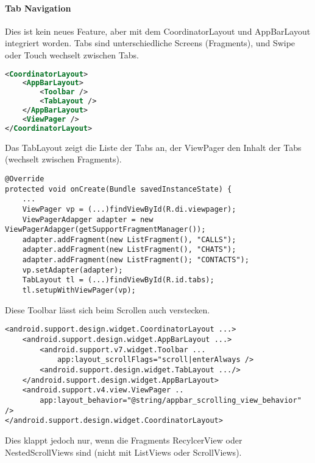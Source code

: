 \paragraph{Tab Navigation} Dies ist kein neues Feature, aber mit dem CoordinatorLayout und AppBarLayout integriert worden. Tabs sind unterschiedliche Screens (Fragments), und Swipe oder Touch wechselt zwischen Tabs.
\begin{lstlisting}[language=xml]
<CoordinatorLayout>
    <AppBarLayout>
        <Toolbar />
        <TabLayout />
    </AppBarLayout>
    <ViewPager />
</CoordinatorLayout>
\end{lstlisting}
Das TabLayout zeigt die Liste der Tabs an, der ViewPager den Inhalt der Tabs (wechselt zwischen Fragments).
\begin{lstlisting}
@Override
protected void onCreate(Bundle savedInstanceState) {
    ...
    ViewPager vp = (...)findViewById(R.di.viewpager);
    ViewPagerAdapger adapter = new ViewPagerAdapger(getSupportFragmentManager());
    adapter.addFragment(new ListFragment(), "CALLS");
    adapter.addFragment(new ListFragment(), "CHATS");
    adapter.addFragment(new ListFragment(); "CONTACTS");
    vp.setAdapter(adapter);
    TabLayout tl = (...)findViewById(R.id.tabs);
    tl.setupWithViewPager(vp);
\end{lstlisting}
Diese Toolbar lässt sich beim Scrollen auch verstecken.
\begin{lstlisting}
<android.support.design.widget.CoordinatorLayout ...>
    <android.support.design.widget.AppBarLayout ...>
        <android.support.v7.widget.Toolbar ...
            app:layout_scrollFlags="scroll|enterAlways />
        <android.support.design.widget.TabLayout .../>
    </android.support.design.widget.AppBarLayout>
    <android.support.v4.view.ViewPager ..
        app:layout_behavior="@string/appbar_scrolling_view_behavior" />
</android.support.design.widget.CoordinatorLayout>
\end{lstlisting}
Dies klappt jedoch nur, wenn die Fragments RecylcerView oder NestedScrollViews sind (nicht mit ListViews oder ScrollViews).